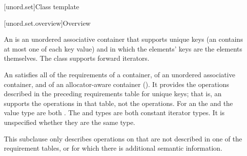 [unord.set]{Class template }%

[unord.set.overview]{Overview}

\pnum
{}%
%
An  is an unordered associative container that
supports unique keys (an  contains at most one of each
key value) and in which the elements' keys are the elements
themselves.
The  class
supports forward iterators.

\pnum
An  satisfies all of the requirements of a container, of an unordered associative container, and of an allocator-aware container (). It provides the operations described in the preceding requirements table for unique keys; that is, an  supports the  operations in that table, not the  operations. For an  the  and the value type are both . The  and  types are both constant iterator types. It is unspecified whether they are the same type.

\pnum
This subclause only describes operations on  that
are not described in one of the requirement tables, or for which there
is additional semantic information.

